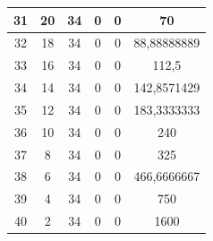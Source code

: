 \begin{table}[]
\begin{tabular}{|c|c|c|c|c|c|}
 			31                                           & 20                     & 34                    & 0                     & 0                      & 70                                                 \\ \hline
 			32                                           & 18                     & 34                    & 0                     & 0                      & 88,88888889                                        \\ \hline
 			33                                           & 16                     & 34                    & 0                     & 0                      & 112,5                                              \\ \hline
 			34                                           & 14                     & 34                    & 0                     & 0                      & 142,8571429                                        \\ \hline
 			35                                           & 12                     & 34                    & 0                     & 0                      & 183,3333333                                        \\ \hline
 			36                                           & 10                     & 34                    & 0                     & 0                      & 240                                                \\ \hline
 			37                                           & 8                      & 34                    & 0                     & 0                      & 325                                                \\ \hline
 			38                                           & 6                      & 34                    & 0                     & 0                      & 466,6666667                                        \\ \hline
 			39                                           & 4                      & 34                    & 0                     & 0                      & 750                                                \\ \hline
 			40                                           & 2                      & 34                    & 0                     & 0                      & 1600                                               \\ \hline
 		\end{tabular}
 	\end{table}

